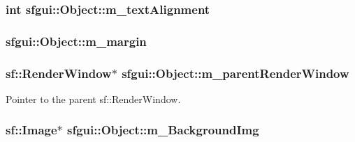 \hypertarget{classsfgui_1_1Object_7cfb56995f2140319df705fb1b146d36}{
\subsubsection[m\_\-textAlignment]{\setlength{\rightskip}{0pt plus 5cm}int {\bf sfgui::Object::m\_\-textAlignment}}}
\label{classsfgui_1_1Object_7cfb56995f2140319df705fb1b146d36}


\hypertarget{classsfgui_1_1Object_b7afeee103f0cfc0c045effa8527a4b4}{
\subsubsection[m\_\-margin]{ {\bf sfgui::Object::m\_\-margin}}}
\label{classsfgui_1_1Object_b7afeee103f0cfc0c045effa8527a4b4}


\hypertarget{classsfgui_1_1Object_518ad23f1c9aab6fd9b346d708c503a8}{
\subsubsection[m\_\-parentRenderWindow]{\setlength{\rightskip}{0pt plus 5cm}sf::RenderWindow$\ast$ {\bf sfgui::Object::m\_\-parentRenderWindow}}}
\label{classsfgui_1_1Object_518ad23f1c9aab6fd9b346d708c503a8}


Pointer to the parent sf::RenderWindow. 

\hypertarget{classsfgui_1_1Object_08225eee55352c02435d14e1bce24dbe}{
\subsubsection[m\_\-BackgroundImg]{\setlength{\rightskip}{0pt plus 5cm}sf::Image$\ast$ {\bf sfgui::Object::m\_\-BackgroundImg}}}
\label{classsfgui_1_1Object_08225eee55352c02435d14e1bce24dbe}


